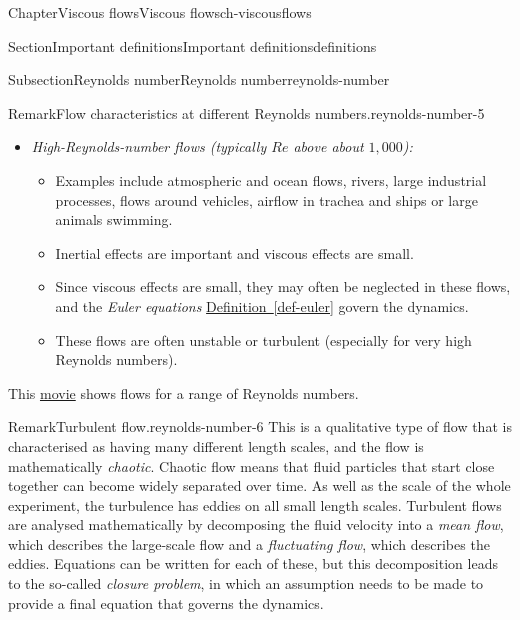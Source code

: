 \documentclass[oneside,10pt,]{book}
\newcommand{\xreffont}{\relax}
\newcommand{\ptxlistdisc}{\raisebox{0.3ex}{\textbullet}}
\newcommand{\ptxlistcircle}{\raisebox{0.3ex}{\textopenbullet}}
\numberwithin{equation}{section}
\begin{document}
\begin{chapterptx}{Chapter}{Viscous flows}{}{Viscous flows}{}{}{ch-viscousflows}
\begin{sectionptx}{Section}{Important definitions}{}{Important definitions}{}{}{definitions}
\begin{subsectionptx}{Subsection}{Reynolds number}{}{Reynolds number}{}{}{reynolds-number}
\begin{remark}{Remark}{Flow characteristics at different Reynolds numbers.}{reynolds-number-5}
\begin{itemize}[label=\ptxlistdisc]
\begin{itemize}[label=\ptxlistcircle]
\item{}Examples include flows in most blood vessels that are not capillaries, small fish swimming, not-too-fast flow out of a domestic tap, stirring a cup of tea.%
\item{}Flows in pipes with moderate Reynolds number are often described as \emph{laminar}, meaning that the fluid moves in ‘layers’ sliding past each other (in fluid dynamics, the word ‘laminar’ is often used to mean that the flow is not \emph{turbulent}).%
\end{itemize}
%
\item{}\emph{High-Reynolds-number flows (typically \(Re\) above about \(1{,}000\)):}%
\begin{itemize}[label=\ptxlistcircle]
\item{}Examples include atmospheric and ocean flows, rivers, large industrial processes, flows around vehicles, airflow in trachea and ships or large animals swimming.%
\item{}Inertial effects are important and viscous effects are small.%
\item{}Since viscous effects are small, they may often be neglected in these flows, and the \emph{Euler equations} \hyperref[def-euler]{Definition~{\xreffont\ref{def-euler}}} govern the dynamics.%
\item{}These flows are often unstable or turbulent (especially for very high Reynolds numbers).%
\end{itemize}
%
\end{itemize}
This \href{https://www-cambridge-org.ezproxy1.bath.ac.uk/core/homsy/category/67}{movie} shows flows for a range of Reynolds numbers.%
\end{remark}
\begin{remark}{Remark}{Turbulent flow.}{reynolds-number-6}%
This is a qualitative type of flow that is characterised as having many different length scales, and the flow is mathematically \emph{chaotic}. Chaotic flow means that fluid particles that start close together can become widely separated over time. As well as the scale of the whole experiment, the turbulence has eddies on all small length scales. Turbulent flows are analysed mathematically by decomposing the fluid velocity into a \emph{mean flow}, which describes the large-scale flow and a \emph{fluctuating flow}, which describes the eddies. Equations can be written for each of these, but this decomposition leads to the so-called \emph{closure problem}, in which an assumption needs to be made to provide a final equation that governs the dynamics.%

\end{remark}
\end{subsectionptx}
\end{sectionptx}
\end{chapterptx}
\end{document}
